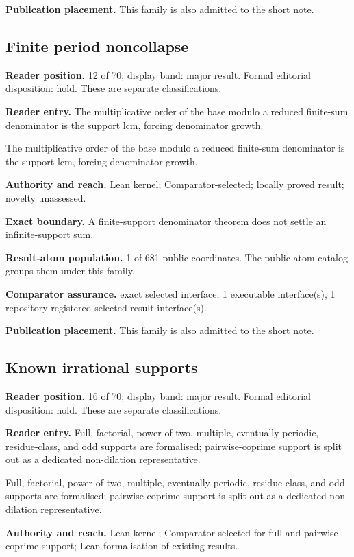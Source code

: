 \textbf{Publication placement.} This family is also admitted to the short note.

\subsection{Finite period noncollapse}
\textbf{Reader position.} 12 of 70; display band: major result.  Formal editorial disposition: hold.  These are separate classifications.

\textbf{Reader entry.} The multiplicative order of the base modulo a reduced finite-sum denominator is the support lcm, forcing denominator growth.

The multiplicative order of the base modulo a reduced finite-sum denominator is the support lcm, forcing denominator growth.

\textbf{Authority and reach.} Lean kernel; Comparator-selected; locally proved result; novelty unassessed.

\textbf{Exact boundary.} A finite-support denominator theorem does not settle an infinite-support sum.

\textbf{Result-atom population.} 1 of 681 public coordinates. The public atom catalog groups them under this family.

\textbf{Comparator assurance.} exact selected interface; 1 executable interface(s), 1 repository-registered selected result interface(s).

\textbf{Publication placement.} This family is also admitted to the short note.

\subsection{Known irrational supports}
\textbf{Reader position.} 16 of 70; display band: major result.  Formal editorial disposition: hold.  These are separate classifications.

\textbf{Reader entry.} Full, factorial, power-of-two, multiple, eventually periodic, residue-class, and odd supports are formalised; pairwise-coprime support is split out as a dedicated non-dilation representative.

Full, factorial, power-of-two, multiple, eventually periodic, residue-class, and odd supports are formalised; pairwise-coprime support is split out as a dedicated non-dilation representative.

\textbf{Authority and reach.} Lean kernel; Comparator-selected for full and pairwise-coprime support; Lean formalisation of existing results.

